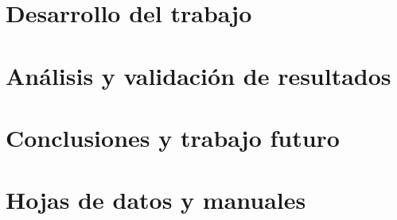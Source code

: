\documentclass[12pt, letterpaper, oneside]{book}
\begin{document}
	\chapter{Desarrollo del trabajo}
	\label{cap:des}
	
	\chapter{Análisis y validación de resultados}
	\label{cap:resul}
	
	\chapter{Conclusiones y trabajo futuro}
	\label{cap:con}
	
	
	
	\label{chap:Biblio}
	\appendix
	\chapter{Hojas de datos y manuales}
	\label{chap:datasheet}
	\vspace*{-0.5cm}
\end{document}
